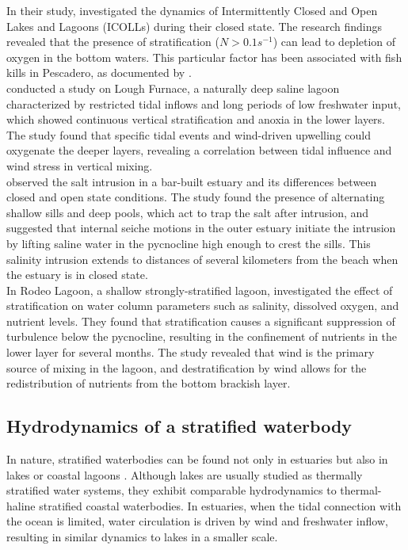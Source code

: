 \documentclass[tesis.tex]{subfiles}
\begin{document}
In their study, \cite{Gale2006} investigated the dynamics of Intermittently Closed and Open Lakes and Lagoons (ICOLLs) during their closed state. The research findings revealed that the presence of stratification ($N > 0.1 s^{-1}$) can lead to  depletion of oxygen in the bottom waters. This particular factor has been associated with fish kills in Pescadero, as documented by \citep{largier2015}.\\

\cite{Kelly2018} conducted a study on Lough Furnace, a naturally deep saline lagoon characterized by restricted tidal inflows and long periods of low freshwater input, which showed continuous vertical stratification and anoxia in the lower layers. The study found that specific tidal events and wind-driven upwelling could oxygenate the deeper layers, revealing a correlation between tidal influence and wind stress in vertical mixing.\\

\cite{Behrens2016} observed the salt intrusion in a bar-built estuary and its differences between closed and open state conditions. The study found the presence of alternating shallow sills and deep pools, which act to trap the salt after intrusion, and suggested that internal seiche motions in the outer estuary initiate the intrusion by lifting saline water in the pycnocline high enough to crest the sills. This salinity intrusion extends to distances of several kilometers from the beach when the estuary is in closed state.\\

In Rodeo Lagoon, a shallow strongly-stratified lagoon, \citep{Cousins2010} investigated the effect of stratification on water column parameters such as salinity, dissolved oxygen, and nutrient levels. They found that stratification causes a significant suppression of turbulence below the pycnocline, resulting in the confinement of nutrients in the lower layer for several months. The study revealed that wind is the primary source of mixing in the lagoon, and destratification by wind allows for the redistribution of nutrients from the bottom brackish layer.\\

\subsection{Hydrodynamics of a stratified waterbody}

In nature, stratified waterbodies can be found not only in estuaries \citep{human2016} but also in lakes \citep{Valerio2012, Imam2013, Coman2012} or coastal lagoons \citep{Cousins2010}. Although lakes are usually studied as thermally stratified water systems, they exhibit comparable hydrodynamics to thermal-haline stratified coastal waterbodies. In estuaries, when the tidal connection with the ocean is limited, water circulation is driven by wind and freshwater inflow, resulting in similar dynamics to lakes in a smaller scale. \\
\end{document}
